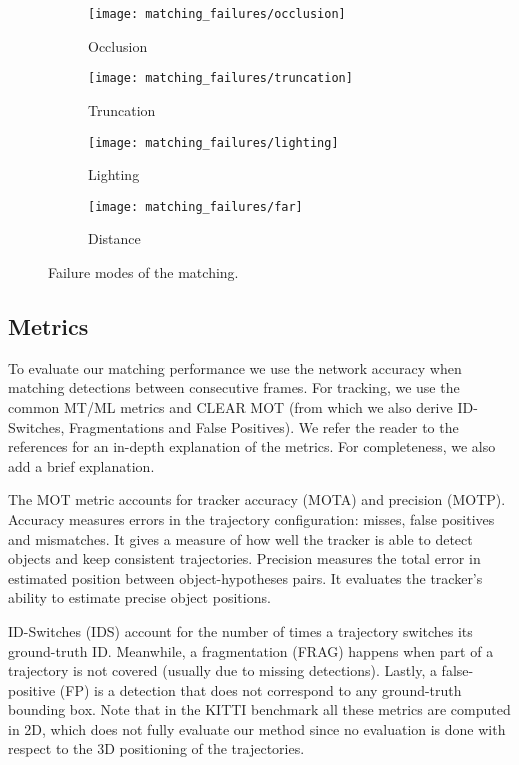 \documentclass[letterpaper, 10 pt, conference]{ieeeconf}  \pdfminorversion=4
\begin{document}
\begin{figure*}[!htb]
\centering
  \begin{subfigure}[b]{.23\textwidth}
    \texttt{[image: matching\_failures/occlusion]}
    \caption{Occlusion}
    \label{fig:occlusion_fail}
  \end{subfigure}
  \begin{subfigure}[b]{.23\textwidth}
    \texttt{[image: matching\_failures/truncation]}
    \caption{Truncation}
    \label{fig:truncation_fail}
  \end{subfigure}
  \begin{subfigure}[b]{.23\textwidth}
    \texttt{[image: matching\_failures/lighting]}
    \caption{Lighting}
    \label{fig:visibility_fail}
  \end{subfigure}
  \begin{subfigure}[b]{.23\textwidth}
    \texttt{[image: matching\_failures/far]}
    \caption{Distance}
    \label{fig:distance_fail}
  \end{subfigure}
  \caption{Failure modes of the matching.}
  \label{fig:matching_failures}
\end{figure*}

\subsection{Metrics}
To evaluate our matching performance we use the network accuracy when matching detections between consecutive frames. For tracking, we use the common MT/ML \cite{mttracker} metrics and CLEAR MOT \cite{clearmot} (from which we also derive ID-Switches, Fragmentations and False Positives). We refer the reader to the references for an in-depth explanation of the metrics. For completeness, we also add a brief explanation.



The MOT metric accounts for tracker accuracy (MOTA) and precision (MOTP). Accuracy measures errors in the trajectory configuration: misses, false positives and mismatches. It gives a measure of how well the tracker is able to detect objects and keep consistent trajectories. Precision measures the total error in estimated position between object-hypotheses pairs. It evaluates the tracker's ability to estimate precise object positions.

ID-Switches (IDS) account for the number of times a trajectory switches its ground-truth ID. Meanwhile, a fragmentation (FRAG) happens when part of a trajectory is not covered (usually due to missing detections). Lastly, a false-positive (FP) is a detection that does not correspond to any ground-truth bounding box. Note that in the KITTI benchmark all these metrics are computed in 2D, which does not fully evaluate our method since no evaluation is done with respect to the 3D positioning of the trajectories.
\end{document}
